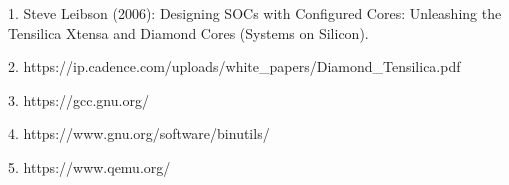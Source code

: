 1. Steve Leibson (2006): Designing SOCs with Configured Cores: Unleashing the Tensilica Xtensa and Diamond Cores (Systems on Silicon).

2. https://ip.cadence.com/uploads/white\_papers/Diamond\_Tensilica.pdf

3. https://gcc.gnu.org/

4. https://www.gnu.org/software/binutils/

5. https://www.qemu.org/ 
 
